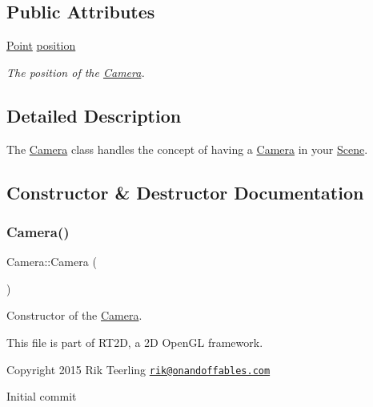 \subsection*{Public Attributes}
\begin{DoxyCompactItemize}
\item 
\mbox{\label{class_camera_a57fa6dbb1aabd24b2aff6644eae36533}} 
\hyperlink{pointx_8h_a1de5e45af54f9f098e4ae388726e9677}{Point} \hyperlink{class_camera_a57fa6dbb1aabd24b2aff6644eae36533}{position}
\begin{DoxyCompactList}\small\item\em The position of the \hyperlink{class_camera}{Camera}. \end{DoxyCompactList}\end{DoxyCompactItemize}


\subsection{Detailed Description}
The \hyperlink{class_camera}{Camera} class handles the concept of having a \hyperlink{class_camera}{Camera} in your \hyperlink{class_scene}{Scene}. 

\subsection{Constructor \& Destructor Documentation}
\mbox{\label{class_camera_a01f94c3543f56ede7af49dc778f19331}} 
\subsubsection{\texorpdfstring{Camera()}{Camera()}}
{\footnotesize\ttfamily Camera\+::\+Camera (\begin{DoxyParamCaption}{ }\end{DoxyParamCaption})}



Constructor of the \hyperlink{class_camera}{Camera}. 

This file is part of R\+T2D, a 2D Open\+GL framework.


\begin{DoxyItemize}
\item Copyright 2015 Rik Teerling \href{mailto:rik@onandoffables.com}{\tt rik@onandoffables.\+com}
\begin{DoxyItemize}
\item Initial commit 
\end{DoxyItemize}
\end{DoxyItemize}

